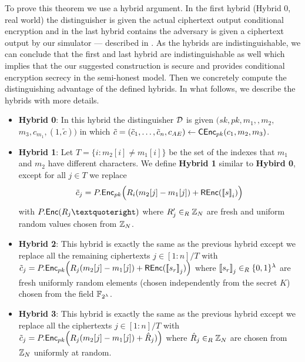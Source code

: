 \begin{remindertheorem}{    }
 \thmSemiHonest
\end{remindertheorem} 
\begin{proofof}{}
	To prove this theorem we use a hybrid argument. In the first hybrid (Hybrid 0, real world) the distinguisher is given the actual ciphertext output conditional encryption and in the last hybrid contains the adversary is given a ciphertext output by our simulator --- described in . As the hybrids are indistinguishable, we can conclude that the first and last hybrid are indistinguishable as well which implies that the our suggested construction is secure and provides conditional encryption secrecy in the semi-honest model. Then we concretely compute the distinguishing advantage of the defined hybrids. In what follows, we describe the hybrids with more details. 
	
	
	 	\begin{itemize}
	 	\item \textbf{Hybrid 0}: In this hybrid the distinguisher $ {\mathcal{D}} $ is given    $(sk, pk,  m_1, ,m_2,$ $ m_3, c_{m_1}, (1, \tilde{c}))$  in which $ \tilde{c} = (\tilde{c}_1, \dots, \tilde{c}_n, c_{AE})  \leftarrow {\ensuremath{\mathsf{C}}}{\ensuremath{\mathsf{Enc}}}_{pk}(c_1,m_2,m_3)$. 
	 	
	 	\item \textbf{Hybrid 1}: Let $T = \{i : m_2[i] \neq m_1[i]\}$ be the set of the indexes that $ m_1 $ and $ m_2 $ have different characters. We define \textbf{Hybrid 1} similar to \textbf{Hybird 0}, except for all $j\in T $ we replace $$\tilde{c}_{j}= P.{\mathsf{Enc}}_{pk}\Big(R_i(m_2[j]-m_1[j])+ {\mathsf{REnc}}(\mathopen{\lbrack\!\lbrack} s \mathclose{\rbrack\!\rbrack}_i)\Big)$$ with $P.\Enc(R_j’)$ where $ R_j' \in_R \mathbb{Z}_N$ are fresh and uniform random values chosen from $\mathbb{Z}_N$.  

	
	 	\item \textbf{Hybrid 2}: This hybrid is exactly the same as the previous hybrid except we replace all the remaining ciphertexts $ j\in [1:n]/ T  $ with $ \tilde{c}_{j}= P.{\mathsf{Enc}}_{pk}\Big(R_j(m_2[j]-m_1[j])+ {\mathsf{REnc}}(\mathopen{\lbrack\!\lbrack} s_r \mathclose{\rbrack\!\rbrack}_j)\Big) $ where $ \mathopen{\lbrack\!\lbrack} s_r \mathclose{\rbrack\!\rbrack}_j \in_R \{0,1\}^{\lambda} $ are fresh uniformly random elements (chosen independently from the secret $K$)  chosen from the field $\mathbb{F}_{2^\lambda}$.

           \item \textbf{Hybrid 3}: This hybrid is exactly the same as the previous hybrid except we replace all the ciphertexts $ j\in [1:n]/ T  $ with $ \tilde{c}_{j}= P.{\mathsf{Enc}}_{pk}\Big(R_j(m_2[j]-m_1[j])+ \hat{R}_j)\Big) $ where $ \hat{R}_j\in_R \mathbb{Z}_N $ are chosen from $\mathbb{Z}_{N}$ uniformly at random.


\end{itemize}
\end{proofof}
